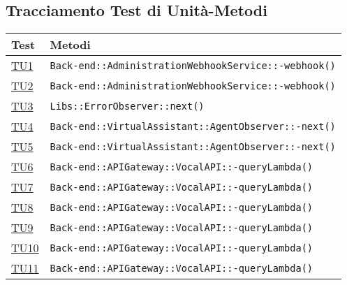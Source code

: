 \subsection{Tracciamento Test di Unità-Metodi}
\normalsize
\begin{longtable}{|>{\centering}m{1cm}|m{12cm}<{\centering}|}
\hline
\textbf{Test} & \textbf{Metodi}\\
\hline
\endhead
\hyperlink{TU1}{TU1} & \texttt{Back-end::AdministrationWebhookService::-\linebreak webhook()}\\ \hline

\hyperlink{TU2}{TU2} & \texttt{Back-end::AdministrationWebhookService::-\linebreak webhook()}\\ \hline

\hyperlink{TU3}{TU3} & \texttt{Libs::ErrorObserver::next()}\\ \hline

\hyperlink{TU4}{TU4} & \texttt{Back-end::VirtualAssistant::AgentObserver::-\linebreak next()}\\ \hline

\hyperlink{TU5}{TU5} & \texttt{Back-end::VirtualAssistant::AgentObserver::-\linebreak next()}\\ \hline

\hyperlink{TU6}{TU6} & \texttt{Back-end::APIGateway::VocalAPI::-\linebreak queryLambda()}\\ \hline

\hyperlink{TU7}{TU7} & \texttt{Back-end::APIGateway::VocalAPI::-\linebreak queryLambda()}\\ \hline

\hyperlink{TU8}{TU8} & \texttt{Back-end::APIGateway::VocalAPI::-\linebreak queryLambda()}\\ \hline

\hyperlink{TU9}{TU9} & \texttt{Back-end::APIGateway::VocalAPI::-\linebreak queryLambda()}\\ \hline

\hyperlink{TU10}{TU10} & \texttt{Back-end::APIGateway::VocalAPI::-\linebreak queryLambda()}\\ \hline

\hyperlink{TU11}{TU11} & \texttt{Back-end::APIGateway::VocalAPI::-\linebreak queryLambda()}\\ \hline


\end{longtable}
